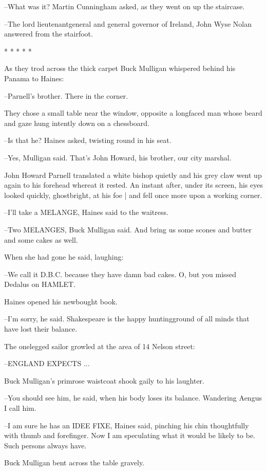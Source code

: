 --What was it? Martin Cunningham asked, as they went on up the staircase.

--The lord lieutenantgeneral and general governor of Ireland,
John Wyse Nolan answered from the stairfoot.


    * * * * *


As they trod across the thick carpet Buck Mulligan whispered behind
his Panama to Haines:

--Parnell's brother. There in the corner.

They chose a small table near the window, opposite a longfaced man
whose beard and gaze hung intently down on a chessboard.

--Is that he? Haines asked, twisting round in his seat.

--Yes, Mulligan said. That's John Howard, his brother, our city marshal.

John Howard Parnell translated a white bishop quietly
and his grey claw went up again to his forehead whereat it rested.
An instant after,
under its screen,
his eyes looked quickly, ghostbright, at his foe |
and fell once more upon a working corner.

--I'll take a MELANGE, Haines said to the waitress.

--Two MELANGES, Buck Mulligan said. And bring us some scones and butter
and some cakes as well.

When she had gone he said, laughing:

--We call it D.B.C. because they have damn bad cakes. O, but you missed
Dedalus on HAMLET.

Haines opened his newbought book.%

--I'm sorry, he said. Shakespeare is the happy huntingground of all minds
that have lost their balance.

The onelegged sailor growled at the area of 14 Nelson street:

--ENGLAND EXPECTS ...

Buck Mulligan's primrose waistcoat shook gaily to his laughter.

--You should see him, he said, when his body loses its balance. Wandering
Aengus I call him.

--I am sure he has an IDEE FIXE,
Haines said,
pinching his chin thoughtfully with thumb and forefinger.
Now I am speculating what it would be likely to be.
Such persons always have.

Buck Mulligan bent across the table gravely.

